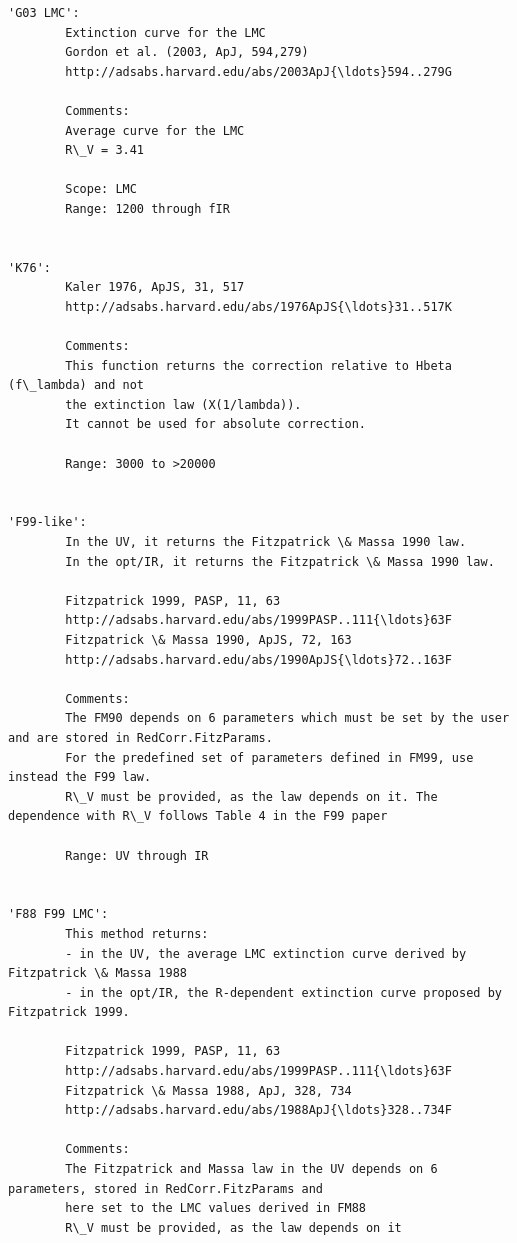 \documentclass{report}
\begin{document}
    \begin{Verbatim}[commandchars=\\\{\}]
'G03 LMC': 
        Extinction curve for the LMC
        Gordon et al. (2003, ApJ, 594,279)
        http://adsabs.harvard.edu/abs/2003ApJ{\ldots}594..279G
        
        Comments:
        Average curve for the LMC
        R\_V = 3.41

        Scope: LMC
        Range: 1200 through fIR   

        
'K76': 
        Kaler 1976, ApJS, 31, 517
        http://adsabs.harvard.edu/abs/1976ApJS{\ldots}31..517K
        
        Comments:
        This function returns the correction relative to Hbeta (f\_lambda) and not
        the extinction law (X(1/lambda)).
        It cannot be used for absolute correction.
        
        Range: 3000 to >20000
        
        
'F99-like': 
        In the UV, it returns the Fitzpatrick \& Massa 1990 law.
        In the opt/IR, it returns the Fitzpatrick \& Massa 1990 law. 
        
        Fitzpatrick 1999, PASP, 11, 63
        http://adsabs.harvard.edu/abs/1999PASP..111{\ldots}63F
        Fitzpatrick \& Massa 1990, ApJS, 72, 163
        http://adsabs.harvard.edu/abs/1990ApJS{\ldots}72..163F
        
        Comments:
        The FM90 depends on 6 parameters which must be set by the user and are stored in RedCorr.FitzParams.
        For the predefined set of parameters defined in FM99, use instead the F99 law.
        R\_V must be provided, as the law depends on it. The dependence with R\_V follows Table 4 in the F99 paper 

        Range: UV through IR
        
        
'F88 F99 LMC': 
        This method returns:
        - in the UV, the average LMC extinction curve derived by Fitzpatrick \& Massa 1988
        - in the opt/IR, the R-dependent extinction curve proposed by Fitzpatrick 1999.
        
        Fitzpatrick 1999, PASP, 11, 63
        http://adsabs.harvard.edu/abs/1999PASP..111{\ldots}63F
        Fitzpatrick \& Massa 1988, ApJ, 328, 734
        http://adsabs.harvard.edu/abs/1988ApJ{\ldots}328..734F
        
        Comments:
        The Fitzpatrick and Massa law in the UV depends on 6 parameters, stored in RedCorr.FitzParams and 
        here set to the LMC values derived in FM88
        R\_V must be provided, as the law depends on it
        

\end{Verbatim}
\end{document}
